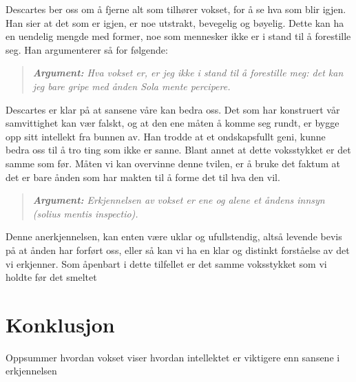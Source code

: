 \documentclass[11pt, a4paper]{article}
\newenvironment{argument}{\begin{quote}\itshape\textbf{Argument: }}{\end{quote}} %
\begin{document}
Descartes ber oss om å fjerne alt som tilhører vokset, for å se hva som blir igjen. Han sier at det som er igjen, er noe utstrakt, bevegelig og bøyelig. Dette kan ha en uendelig mengde med former, noe som mennesker ikke er i stand til å forestille seg. Han argumenterer så for følgende:


\begin{argument}
    Hva vokset er, er jeg ikke i stand til å forestille meg: det kan jeg bare gripe med ånden \textit{Sola mente percipere}. 
\end{argument}




Descartes er klar på at sansene våre kan bedra oss. Det som har konstruert vår samvittighet kan vær falskt, og at den ene måten å komme seg rundt, er bygge opp sitt intellekt fra bunnen av. Han trodde at et ondskapsfullt geni, kunne bedra oss til å tro ting som ikke er sanne. Blant annet at dette voksstykket er det samme som før. Måten vi kan overvinne denne tvilen, er å bruke det faktum at det er bare ånden som har makten til å forme det til hva den vil.



\begin{argument}
    Erkjennelsen av vokset er ene og alene et åndens innsyn (\textit{solius mentis inspectio}). 
\end{argument}


Denne anerkjennelsen, kan enten være uklar og ufullstendig, altså levende bevis på at ånden har forført oss, eller så kan vi ha en klar og distinkt forståelse av det vi erkjenner. Som åpenbart i dette tilfellet er det samme voksstykket som vi holdte før det smeltet

\section{Konklusjon}

Oppsummer hvordan vokset viser hvordan intellektet er viktigere enn sansene i erkjennelsen
\end{document}
